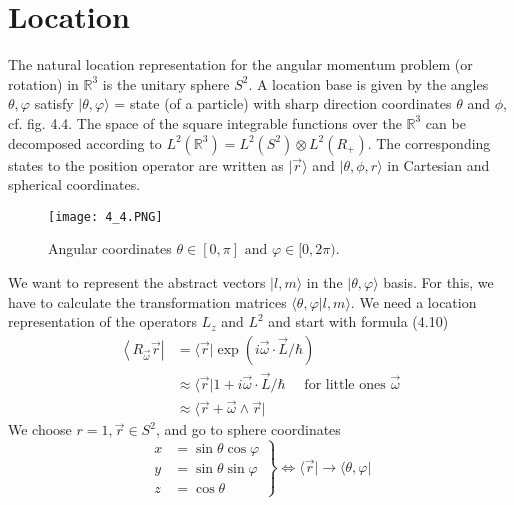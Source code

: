 \section{Location}
The natural location representation for the angular momentum problem (or rotation) in $\mathbb{R}^3$ is the unitary sphere $S^2$. A location base is given by the angles $\theta, \varphi$ satisfy $|\theta, \varphi\rangle$ = state (of a particle) with sharp direction coordinates $\theta$ and $\phi$, cf. fig. 4.4. The space of the square integrable functions over the $\mathbb{R}^3$ can be decomposed according to $L^2 (\mathbb{R}^3) = L^2 (S^2) \otimes L^2 (R_+)$. The corresponding states to the position operator are written as $| \vec{r}\rangle$ and $| \theta, \phi, r\rangle$ in Cartesian and spherical coordinates.
\begin{figure}[ht]
    \begin{minipage}{0.5\textwidth}
        \centering
        \texttt{[image: 4\_4.PNG]}
    \end{minipage}
    \begin{minipage}{0.5\textwidth}
        \caption{Angular coordinates $\theta \in[0, \pi] \text{ and } \varphi \in [0, 2\pi)$.}
    \end{minipage}
\end{figure}
We want to represent the abstract vectors $|l,m\rangle$ in the $|\theta, \varphi\rangle$ basis. For this, we have to calculate the transformation matrices $\langle \theta, \varphi|l, m\rangle$. We need a location representation of the operators $L_z$ and $L^2$ and start with formula (4.10)
\begin{equation}
\begin{aligned}\left\langle R_{\vec{\omega}} \vec{r}\right| &=\langle\vec{r}| \exp (i \vec{\omega} \cdot \vec{L} / \hbar) \\ & \approx\langle\vec{r}| 1+i \vec{\omega} \cdot \vec{L} / \hbar \quad \text { for little ones } \vec{\omega} \\ & \approx\langle\vec{r}+\vec{\omega} \wedge \vec{r}| \end{aligned}
\end{equation}
We choose $r = 1, \vec{r}\in S^2$, and go to sphere coordinates
\begin{equation}
\left.\begin{array}{rl}{x} & {=\sin \theta \cos \varphi} \\ {y} & {=\sin \theta \sin \varphi} \\ {z} & {=\cos \theta}\end{array}\right\} \Leftrightarrow\langle\vec{r}|\rightarrow\langle\theta, \varphi|
\end{equation}
